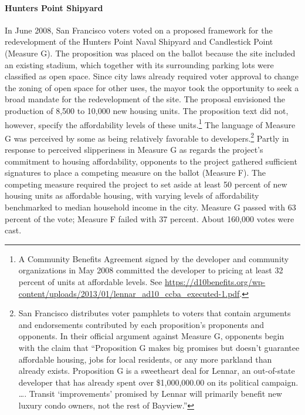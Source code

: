 \documentclass[article,12pt]{memoir}
\begin{document}
\paragraph{Hunters Point Shipyard} In June 2008, San Francisco voters voted on a proposed framework for the redevelopment of the Hunters Point Naval Shipyard and Candlestick Point (Measure G). The proposition was placed on the ballot because the site included an existing stadium, which together with its surrounding parking lots were classified as open space. Since city laws already required voter approval to change the zoning of open space for other uses, the mayor took the opportunity to seek a broad mandate for the redevelopment of the site. The proposal envisioned the production of 8,500 to 10,000 new housing units. The proposition text did not, however, specify the affordability levels of these units.\footnote{A Community Benefits Agreement signed by the developer and community organizations in May 2008 committed the developer to pricing at least 32 percent of units at affordable levels. See \url{https://d10benefits.org/wp-content/uploads/2013/01/lennar_ad10_ccba_executed-1.pdf}.} The language of Measure G was perceived by some as being relatively favorable to developers.\footnote{San Francisco distributes voter pamphlets to voters that contain arguments and endorsements contributed by each proposition's proponents and opponents. In their official argument against Measure G, opponents begin with the claim that ``Proposition G makes big promises but doesn't guarantee affordable housing, jobs for local residents, or any more parkland than already exists. Proposition G is a sweetheart deal for Lennar, an out-of-state developer that has already spent over \$1,000,000.00 on its political campaign. \ldots{}. Transit `improvements' promised by Lennar will primarily benefit new luxury condo owners, not the rest of Bayview.''}  Partly in response to perceived slipperiness in Measure G as regards the project's commitment to housing affordability, opponents to the project gathered sufficient signatures to place a competing measure on the ballot (Measure F). The competing measure required the project to set aside at least 50 percent of new housing units as affordable housing, with varying levels of affordability benchmarked to median household income in the city. Measure G passed with 63 percent of the vote; Measure F failed with 37 percent. About 160,000 votes were cast.
\end{document}
